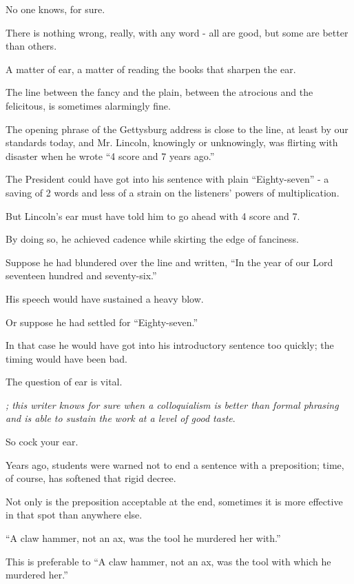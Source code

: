 \documentclass{book}
\numberwithin{equation}{section}
\begin{document}
No one knows, for sure.

There is nothing wrong, really, with any word - all are good, but some are better than others.

A matter of ear, a matter of reading the books that sharpen the ear.

%
The line between the fancy and the plain, between the atrocious and the felicitous, is sometimes alarmingly fine.

The opening phrase of the Gettysburg address is close to the line, at least by our standards today, and Mr. Lincoln, knowingly or unknowingly, was flirting with disaster when he wrote ``4 score and 7 years ago.''

The President could have got into his sentence with plain ``Eighty-seven'' - a saving of 2 words and less of a strain on the listeners' powers of multiplication.

But Lincoln's ear must have told him to go ahead with 4 score and 7.

By doing so, he achieved cadence while skirting the edge of fanciness.

Suppose he had blundered over the line and written, ``In the year of our Lord seventeen hundred and seventy-six.''

His speech would have sustained a heavy blow.

Or suppose he had settled for ``Eighty-seven.''

In that case he would have got into his introductory sentence too quickly; the timing would have been bad.

%
The question of ear is vital.

\textit{; this writer knows for sure when a colloquialism is better than formal phrasing and is able to sustain the work at a level of good taste}.

So cock your ear.

Years ago, students were warned not to end a sentence with a preposition; time, of course, has softened that rigid decree.

Not only is the preposition acceptable at the end, sometimes it is more effective in that spot than anywhere else.

``A claw hammer, not an ax, was the tool he murdered her with.''

This is preferable to ``A claw hammer, not an ax, was the tool with which he murdered her.''
\end{document}
